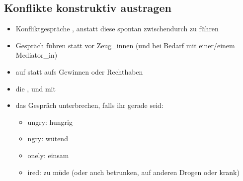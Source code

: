 \subsection{Konflikte konstruktiv austragen}

\begin{itemize}
    \item Konfliktgespräche , anstatt diese spontan zwischendurch zu führen
    \item Gespräch  führen statt vor Zeug\_innen (und bei Bedarf mit einer/einem Mediator\_in)
    \item auf  statt aufs Gewinnen oder Rechthaben
    \item die , und mit 
    \item das Gespräch unterbrechen, falls ihr gerade  seid:
    \begin{itemize}
        \item {}ungry: hungrig
        \item {}ngry: wütend
        \item {}onely: einsam
        \item {}ired: zu müde (oder auch betrunken, auf anderen Drogen oder krank)
    \end{itemize}
\end{itemize}
